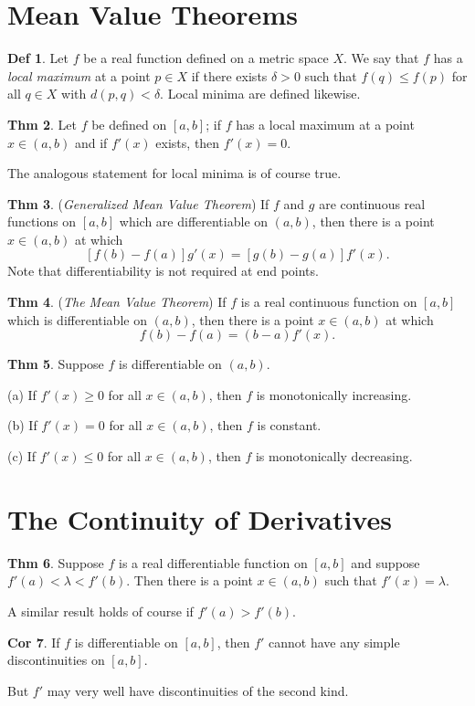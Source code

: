\documentclass{article}
\theoremstyle{definition}
\newtheorem{definition}{Def}
\newtheorem{theorem}[definition]{Thm}
\newtheorem{corollary}[definition]{Cor}
\begin{document}
\section{Mean Value Theorems}
\begin{definition}
    Let $f$ be a real function defined on a metric space $X$. We say that $f$ has a \textit{local maximum} at a point $p\in X$ if there exists $\delta>0$ such that $f(q)\leq f(p)$ for all $q\in X$ with $d(p, q)<\delta$. Local minima are defined likewise.
\end{definition}
\begin{theorem}
    Let $f$ be defined on $[a,b]$; if $f$ has a local maximum at a point $x\in (a,b)$ and if $f'(x)$ exists, then $f'(x)=0$.\par
    The analogous statement for local minima is of course true.
\end{theorem}
\begin{theorem}
    (\textit{Generalized Mean Value Theorem}) If $f$ and $g$ are continuous real functions on $[a, b]$ which are differentiable on $(a,b)$, then there is a point $x\in (a, b)$ at which
    \[
    [f(b)-f(a)]g'(x)=[g(b)-g(a)]f'(x).
    \]
    Note that differentiability is not required at end points.
\end{theorem}
\begin{theorem}
    (\textit{The Mean Value Theorem}) If $f$ is a real continuous function on $[a, b]$ which is differentiable on $(a, b)$, then there is a point $x\in (a, b)$ at which
    \[
    f(b)-f(a)=(b-a)f'(x).
    \]
\end{theorem}
\begin{theorem}
    Suppose $f$ is differentiable on $(a, b)$.\par
    (a) If $f'(x)\geq 0$ for all $x\in (a, b)$, then $f$ is monotonically increasing.\par
    (b) If $f'(x)=0$ for all $x\in (a, b)$, then $f$ is constant.\par
    (c) If $f'(x) \leq 0$ for all $x\in (a, b)$, then $f$ is monotonically decreasing.
\end{theorem}

\section{The Continuity of Derivatives}
\begin{theorem}
    Suppose $f$ is a real differentiable function on $[a,b]$ and suppose $f'(a)<\lambda <f'(b)$. Then there is a point $x\in (a, b)$ such that $f'(x)=\lambda$.\par
    A similar result holds of course if $f'(a)>f'(b)$.
\end{theorem}
\begin{corollary}
    If $f$ is differentiable on $[a, b]$, then $f'$ cannot have any simple discontinuities on $[a, b]$.\par
    But $f'$ may very well have discontinuities of the second kind.
\end{corollary}
\end{document}

